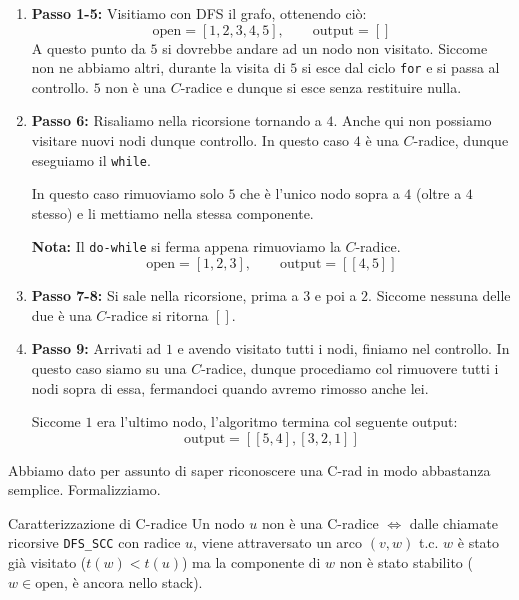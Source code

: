 \documentclass[12pt]{report}
\begin{document}
	\begin{enumerate}
		\item \textbf{Passo 1-5:} Visitiamo con DFS il grafo, ottenendo ciò:
		\[
		\text{open} = [1, 2, 3, 4, 5], \qquad \text{output} = []
		\]
		A questo punto da $5$ si dovrebbe andare ad un nodo non visitato. Siccome non ne abbiamo altri, durante la visita di $5$ si esce dal ciclo \texttt{for} e si passa al controllo.
		$5$ non è una $C$-radice e dunque si esce senza restituire nulla.
		
		\item \textbf{Passo 6:} Risaliamo nella ricorsione tornando a $4$. Anche qui non possiamo visitare nuovi nodi dunque controllo. In questo caso $4$ è una $C$-radice, dunque eseguiamo il \texttt{while}.
		
		In questo caso rimuoviamo solo $5$ che è l'unico nodo sopra a $4$ (oltre a $4$ stesso) e li mettiamo nella stessa componente.
		
		\textbf{Nota:} Il \texttt{do-while} si ferma appena rimuoviamo la $C$-radice.
		\[
		\text{open} = [1, 2, 3], \qquad \text{output} = [[4, 5]]
		\]
		
		\item \textbf{Passo 7-8:} Si sale nella ricorsione, prima a $3$ e poi a $2$. Siccome nessuna delle due è una $C$-radice si ritorna $[]$.
		
		\item \textbf{Passo 9:} Arrivati ad $1$ e avendo visitato tutti i nodi, finiamo nel controllo.
		In questo caso siamo su una $C$-radice, dunque procediamo col rimuovere tutti i nodi sopra di essa, fermandoci quando avremo rimosso anche lei.
		
		Siccome $1$ era l'ultimo nodo, l'algoritmo termina col seguente output:
		\[
		\text{output} = [[5, 4], [3, 2, 1]]
		\]
	\end{enumerate}
	
	Abbiamo dato per assunto di saper riconoscere una C-rad in modo abbastanza semplice. Formalizziamo.
	
	\begin{proposizione}{Caratterizzazione di C-radice}{}
		Un nodo $u$ non è una C-radice $\iff$ dalle chiamate ricorsive \texttt{DFS\_SCC} con radice $u$, viene attraversato un arco $(v, w)$ t.c. $w$ è stato già visitato ($t(w) < t(u)$) ma la componente di $w$ non è stato stabilito ($w \in \text{open}$, è ancora nello stack).\\
	\end{proposizione}
	
\end{document}
